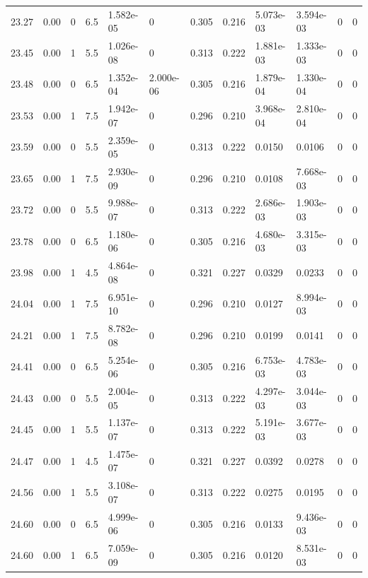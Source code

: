 \documentclass[preview]{standalone}
\begin{document}
{{{{{{{\begin{tabular}{L{1.2cm}C{1.2cm} C{0.3cm}C{0.5cm} C{1.4cm}C{1.4cm} C{1.4cm}C{1.4cm} C{1.6cm}C{1.6cm} C{1.6cm}C{1.6cm}}
  23.27  &  0.00  & 0     & 6.5 &  1.582e-05  & 0  &  0.305&   0.216& 5.073e-03 & 3.594e-03   &  0 & 0  \\ 
  23.45  &  0.00  & 1     & 5.5 &  1.026e-08  & 0  &  0.313&   0.222& 1.881e-03 & 1.333e-03   &  0 & 0  \\ 
  23.48  &  0.00  & 0     & 6.5 &  1.352e-04  & 2.000e-06  &  0.305&   0.216& 1.879e-04 & 1.330e-04   &  0 & 0  \\ 
  23.53  &  0.00  & 1     & 7.5 &  1.942e-07  & 0  &  0.296&   0.210& 3.968e-04 & 2.810e-04   &  0 & 0  \\ 
  23.59  &  0.00  & 0     & 5.5 &  2.359e-05  & 0  &  0.313&   0.222& 0.0150 & 0.0106   &  0 & 0  \\ 
  23.65  &  0.00  & 1     & 7.5 &  2.930e-09  & 0  &  0.296&   0.210& 0.0108 & 7.668e-03   &  0 & 0  \\ 
  23.72  &  0.00  & 0     & 5.5 &  9.988e-07  & 0  &  0.313&   0.222& 2.686e-03 & 1.903e-03   &  0 & 0  \\ 
  23.78  &  0.00  & 0     & 6.5 &  1.180e-06  & 0  &  0.305&   0.216& 4.680e-03 & 3.315e-03   &  0 & 0  \\ 
  23.98  &  0.00  & 1     & 4.5 &  4.864e-08  & 0  &  0.321&   0.227& 0.0329 & 0.0233   &  0 & 0  \\ 
  24.04  &  0.00  & 1     & 7.5 &  6.951e-10  & 0  &  0.296&   0.210& 0.0127 & 8.994e-03   &  0 & 0  \\ 
  24.21  &  0.00  & 1     & 7.5 &  8.782e-08  & 0  &  0.296&   0.210& 0.0199 & 0.0141   &  0 & 0  \\ 
  24.41  &  0.00  & 0     & 6.5 &  5.254e-06  & 0  &  0.305&   0.216& 6.753e-03 & 4.783e-03   &  0 & 0  \\ 
  24.43  &  0.00  & 0     & 5.5 &  2.004e-05  & 0  &  0.313&   0.222& 4.297e-03 & 3.044e-03   &  0 & 0  \\ 
  24.45  &  0.00  & 1     & 5.5 &  1.137e-07  & 0  &  0.313&   0.222& 5.191e-03 & 3.677e-03   &  0 & 0  \\ 
  24.47  &  0.00  & 1     & 4.5 &  1.475e-07  & 0  &  0.321&   0.227& 0.0392 & 0.0278   &  0 & 0  \\ 
  24.56  &  0.00  & 1     & 5.5 &  3.108e-07  & 0  &  0.313&   0.222& 0.0275 & 0.0195   &  0 & 0  \\ 
  24.60  &  0.00  & 0     & 6.5 &  4.999e-06  & 0  &  0.305&   0.216& 0.0133 & 9.436e-03   &  0 & 0  \\ 
  24.60  &  0.00  & 1     & 6.5 &  7.059e-09  & 0  &  0.305&   0.216& 0.0120 & 8.531e-03   &  0 & 0  \\ 

\end{tabular}}}}}}}}
\end{document}
